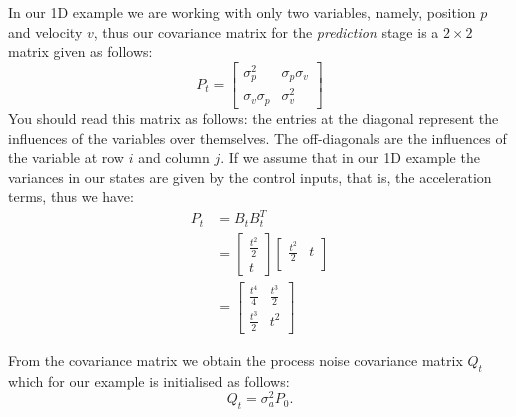 \documentclass[12pt,a4paper,final]{article} %
\begin{document}
In our 1D example we are working with only two variables, namely,
position $p$ and velocity $v$, thus our covariance matrix for the
\textit{prediction} stage is a $2 \times 2$ matrix given as follows:
\begin{equation}
  \label{eq:covariance_Q}
  P_t =
  \begin{bmatrix}
    \sigma_p^2 & \sigma_{p}\sigma_{v} \\
    \sigma_{v}\sigma_{p} & \sigma_v^2
  \end{bmatrix}
\end{equation}
You should read this matrix as follows: the entries at the diagonal
represent the influences of the variables over themselves. The
off-diagonals are the influences of the variable at row $i$ and column
$j$. If we assume that in our 1D example the variances in our states
are given by the control inputs, that is, the acceleration terms, thus
we have:
\begin{align}
  \label{eq:covarianve_1D_example}
  P_t &=
        B_t B_t^T\\
      &= 
        \begin{bmatrix}
          \frac{t^2}{2} \\
          t
        \end{bmatrix}
        \begin{bmatrix}
          \frac{t^2}{2} & t\\
        \end{bmatrix}\\
      &=
        \begin{bmatrix}
          \frac{t^4}{4} & \frac{t^3}{2}\\
          \frac{t^3}{2} & t^2
        \end{bmatrix}
\end{align}

From the covariance matrix we obtain the process noise covariance
matrix $Q_t$ which for our example is initialised as follows:
\begin{equation}
  \label{eq:noise_Q}
  Q_t = \sigma_a^2 P_0.
\end{equation}
\end{document}
